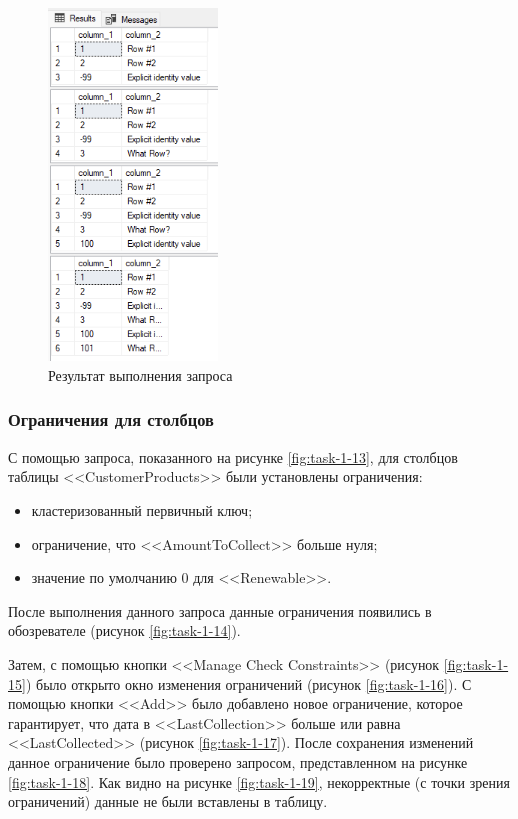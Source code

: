 \documentclass[a4paper, 14pt]{extarticle}
\begin{document}
\begin{figure}[H]
  \centering
  \includegraphics[width=0.4\textwidth]{images/task-1/12.png}
  \caption{Результат выполнения запроса}
  \label{fig:task-1-12}
\end{figure}

\subsubsection{Ограничения для столбцов}

С помощью запроса, показанного на рисунке \ref{fig:task-1-13}, для столбцов
таблицы <<\foreignlanguage{english}{CustomerProducts}>> были установлены
ограничения:
\begin{itemize}
  \item кластеризованный первичный ключ;
  \item ограничение, что <<\foreignlanguage{english}{AmountToCollect}>> больше
  нуля;
  \item значение по умолчанию 0 для <<\foreignlanguage{english}{Renewable}>>.
\end{itemize}
После выполнения данного запроса данные ограничения появились в обозревателе
(рисунок \ref{fig:task-1-14}).

Затем, с помощью кнопки <<\foreignlanguage{english}{Manage Check Constraints}>>
(рисунок \ref{fig:task-1-15}) было открыто окно изменения ограничений (рисунок
\ref{fig:task-1-16}). С помощью кнопки <<\foreignlanguage{english}{Add}>> было
добавлено новое ограничение, которое гарантирует, что дата в
<<\foreignlanguage{english}{LastCollection}>> больше или равна
<<\foreignlanguage{english}{LastCollected}>> (рисунок \ref{fig:task-1-17}).
После сохранения изменений данное ограничение было проверено запросом,
представленном на рисунке \ref{fig:task-1-18}. Как видно на рисунке
\ref{fig:task-1-19}, некорректные (с точки зрения ограничений) данные не были
вставлены в таблицу.
\end{document}
